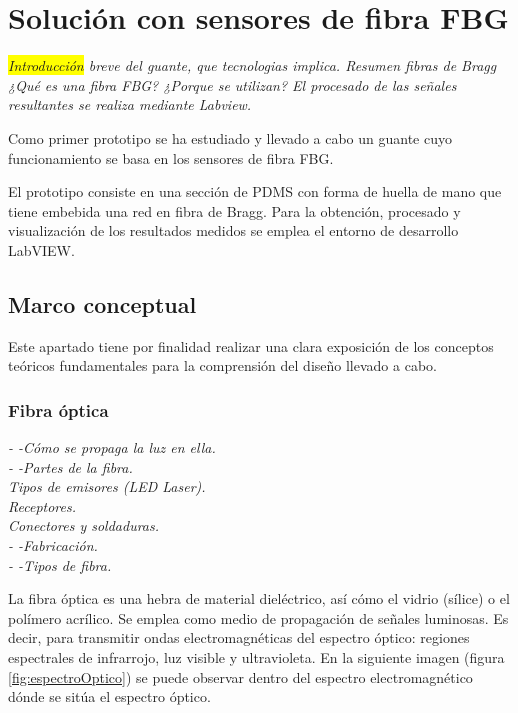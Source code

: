 \chapter{Solución con sensores de fibra FBG\label{sec:FBG}}

\label{sec:FBG3}

\textcolor{rositaoscuro}{
	\textit{
		\colorbox{yellow}{Introducción} breve del guante, que tecnologias implica.
		Resumen fibras de Bragg 
		¿Qué es una fibra FBG?
		¿Porque se utilizan?
		El procesado de las señales resultantes se realiza mediante Labview.
	}
}


 Como primer prototipo se ha estudiado y llevado a cabo un guante cuyo funcionamiento se basa en los sensores de fibra FBG. 
 
 El prototipo consiste en una sección de PDMS con forma de huella de mano que tiene embebida una red en fibra de Bragg. Para la obtención, procesado y visualización de los resultados medidos se emplea el entorno de desarrollo LabVIEW.



\section{Marco conceptual}
\label{sec:marco3}

Este apartado tiene por finalidad realizar una clara exposición de los conceptos teóricos fundamentales para la comprensión del diseño llevado a cabo. 


\subsection{Fibra óptica}
\label{sec:fibra3}
	\textcolor{rositaoscuro}{
		\textit{
			- -Cómo se propaga la luz en ella.\\
	 		- -Partes de la fibra.\\
			Tipos de emisores (LED Laser).\\
			Receptores.\\
			Conectores y soldaduras.\\
			- -Fabricación.\\
			- -Tipos de fibra.\\
		}
	}

	La fibra óptica es una hebra de material dieléctrico, así cómo el vidrio (sílice) o el polímero acrílico. 
	Se emplea como medio de propagación de señales luminosas. Es decir, para transmitir ondas electromagnéticas del espectro óptico: regiones espectrales de infrarrojo, luz visible y ultravioleta. En la siguiente imagen (figura \ref{fig:espectroOptico}) se puede observar dentro del espectro electromagnético dónde se sitúa el espectro óptico.	 
	
